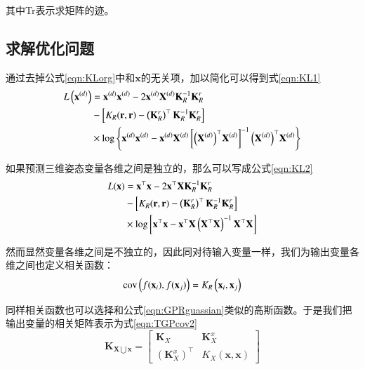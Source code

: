 其中Tr表示求矩阵的迹。
\subsection{求解优化问题}
通过去掉公式\ref{eqn:KLorg}中和$\mathbf{x}$的无关项，加以简化可以得到式\ref{eqn:KL1}
\begin{align}
 L\left(\mathbf{x}^{(d)}\right) &= \mathbf{x}^{(d)}\mathbf{x}^{(d)}-2\mathbf{x}^{(d)} \mathbf{X}^{(d)} \mathbf{K}_R^{-1} \mathbf{K}_R^r \notag\\
               &- \left[K_R(\mathbf{r},\mathbf{r}) - \left(\mathbf{K}_R^r\right)^\top \mathbf{K}_R^{-1} \mathbf{K}_R^r\right] \notag\\
               &\times \log\left\{\mathbf{x}^{(d)}\mathbf{x}^{(d)} - \mathbf{x}^{(d)}\mathbf{X}^{(d)} \left[{\left(\mathbf{X}^{(d)}\right)}^\top \mathbf{X}^{(d)}\right]^{-1} {\left(\mathbf{X}^{(d)}\right)}^\top \mathbf{X}^{(d)} \right\}\label{eqn:KL1}
 \end{align}

 如果预测三维姿态变量各维之间是独立的，那么可以写成公式\ref{eqn:KL2}
 \begin{align}
 L(\mathbf{x}) &= \mathbf{x}^\top\mathbf{x}-2\mathbf{x}^\top \mathbf{X} \mathbf{K}_R^{-1} \mathbf{K}_R^r \notag\\
               &- \left[K_R(\mathbf{r},\mathbf{r}) - \left(\mathbf{K}_R^r\right)^\top \mathbf{K}_R^{-1} \mathbf{K}_R^r\right] \notag\\
               &\times \log\left[\mathbf{x}^\top\mathbf{x} - \mathbf{x}^\top\mathbf{X}
               \left({\mathbf{X}}^\top \mathbf{X}\right)^{-1} {\mathbf{X}}^\top \mathbf{X}\right]\label{eqn:KL2}
 \end{align}

然而显然变量各维之间是不独立的，因此同对待输入变量一样，我们为输出变量各维之间也定义相关函数：
\begin{equation}
  \textmd{cov}\left(f(\mathbf{x}_i),f(\mathbf{x}_j)\right) = K_R\left(\mathbf{x}_i,\mathbf{x}_j\right)\label{eqn:TGPcov}
\end{equation}

同样相关函数也可以选择和公式\ref{eqn:GPRguassian}类似的高斯函数。于是我们把输出变量的相关矩阵表示为式\ref{eqn:TGPcov2}
\begin{equation}
    \mathbf{K}_{\mathbf{X}\bigcup \mathbf{x}} = \begin{bmatrix} \mathbf{K}_X & \mathbf{K}_X^x \\ {\left(\mathbf{K}_X^x\right)}^\top & K_X\left(\mathbf{x},\mathbf{x}\right) \end{bmatrix}\label{eqn:TGPcov2}
\end{equation}

